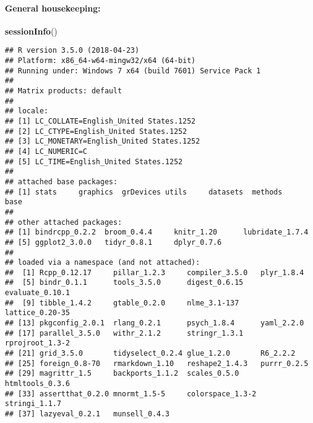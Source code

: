 \documentclass[]{article}
\newenvironment{Shaded}{\begin{snugshade}}{\end{snugshade}}
\newcommand{\KeywordTok}[1]{\textcolor[rgb]{0.13,0.29,0.53}{\textbf{#1}}}
\newcommand{\DataTypeTok}[1]{\textcolor[rgb]{0.13,0.29,0.53}{#1}}
\newcommand{\StringTok}[1]{\textcolor[rgb]{0.31,0.60,0.02}{#1}}
\newcommand{\OperatorTok}[1]{\textcolor[rgb]{0.81,0.36,0.00}{\textbf{#1}}}
\newcommand{\NormalTok}[1]{#1}
\let\oldparagraph\paragraph
\renewcommand{\paragraph}[1]{\oldparagraph{#1}\mbox{}}
\begin{document}
\begin{Shaded}
\end{Shaded}

\paragraph{General housekeeping:}\label{general-housekeeping}

\begin{Shaded}
\begin{Highlighting}[]
\KeywordTok{sessionInfo}\NormalTok{()}
\end{Highlighting}
\end{Shaded}

\begin{verbatim}
## R version 3.5.0 (2018-04-23)
## Platform: x86_64-w64-mingw32/x64 (64-bit)
## Running under: Windows 7 x64 (build 7601) Service Pack 1
## 
## Matrix products: default
## 
## locale:
## [1] LC_COLLATE=English_United States.1252 
## [2] LC_CTYPE=English_United States.1252   
## [3] LC_MONETARY=English_United States.1252
## [4] LC_NUMERIC=C                          
## [5] LC_TIME=English_United States.1252    
## 
## attached base packages:
## [1] stats     graphics  grDevices utils     datasets  methods   base     
## 
## other attached packages:
## [1] bindrcpp_0.2.2  broom_0.4.4     knitr_1.20      lubridate_1.7.4
## [5] ggplot2_3.0.0   tidyr_0.8.1     dplyr_0.7.6    
## 
## loaded via a namespace (and not attached):
##  [1] Rcpp_0.12.17     pillar_1.2.3     compiler_3.5.0   plyr_1.8.4      
##  [5] bindr_0.1.1      tools_3.5.0      digest_0.6.15    evaluate_0.10.1 
##  [9] tibble_1.4.2     gtable_0.2.0     nlme_3.1-137     lattice_0.20-35 
## [13] pkgconfig_2.0.1  rlang_0.2.1      psych_1.8.4      yaml_2.2.0      
## [17] parallel_3.5.0   withr_2.1.2      stringr_1.3.1    rprojroot_1.3-2 
## [21] grid_3.5.0       tidyselect_0.2.4 glue_1.2.0       R6_2.2.2        
## [25] foreign_0.8-70   rmarkdown_1.10   reshape2_1.4.3   purrr_0.2.5     
## [29] magrittr_1.5     backports_1.1.2  scales_0.5.0     htmltools_0.3.6 
## [33] assertthat_0.2.0 mnormt_1.5-5     colorspace_1.3-2 stringi_1.1.7   
## [37] lazyeval_0.2.1   munsell_0.4.3
\end{verbatim}
\end{document}
